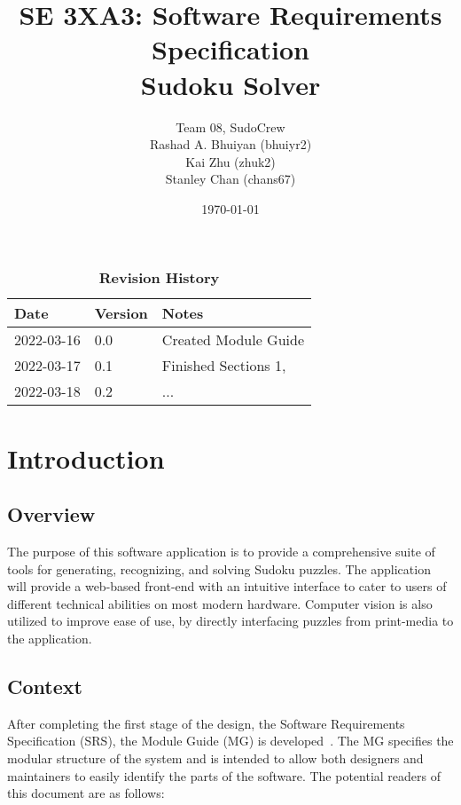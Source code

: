 \documentclass[12pt, titlepage]{article}
\title{SE 3XA3: Software Requirements Specification\\Sudoku Solver}
\author{Team 08, SudoCrew
		\\ Rashad A. Bhuiyan (bhuiyr2)
		\\ Kai Zhu (zhuk2)
		\\ Stanley Chan (chans67)
}
\date{\today}
\begin{document}
\maketitle

\tableofcontents
\listoftables
\listoffigures

\newpage

\begin{table}[h]
\caption{\bf Revision History}
\begin{tabularx}{\textwidth}{p{3cm}p{2cm}X}
\toprule {\bf Date} & {\bf Version} & {\bf Notes}\\
\midrule
2022-03-16 & 0.0 & Created Module Guide\\
2022-03-17 & 0.1 & Finished Sections 1,\\
2022-03-18 & 0.2 & ...\\
\bottomrule
\end{tabularx}
\end{table}

\newpage


\section{Introduction}

\subsection{Overview}
The purpose of this software application is to provide a comprehensive suite of tools for generating, recognizing, and solving Sudoku puzzles. The application will provide a web-based front-end with an intuitive interface to cater to users of different technical abilities on most modern hardware. Computer vision is also utilized to improve ease of use, by directly interfacing puzzles from print-media to the application.

\subsection{Context}
After completing the first stage of the design, the Software Requirements
Specification (SRS), the Module Guide (MG) is developed~\citep{ParnasEtAl1984}. The MG
specifies the modular structure of the system and is intended to allow both
designers and maintainers to easily identify the parts of the software.  The
potential readers of this document are as follows:
\end{document}
